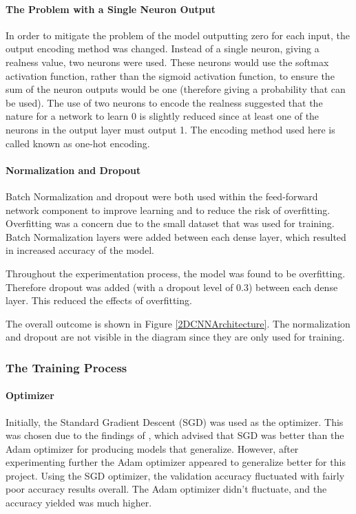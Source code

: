 \documentclass[12pt,a4paper]{article}
\begin{document}
                \paragraph{The Problem with a Single Neuron Output}
                In order to mitigate the problem of the model outputting zero for each input, the output encoding method was changed. Instead of a single neuron, giving a realness value, two neurons were used.
                These neurons would use the softmax activation function, rather than the sigmoid activation function, to ensure the sum of the neuron outputs would be one (therefore giving a probability that can be used).
                The use of two neurons to encode the realness suggested that the nature for a network to learn 0 is slightly reduced since at least one of the neurons in the output layer must output 1. The encoding method used here
                is called known as one-hot encoding.

                \paragraph{Normalization and Dropout}
                Batch Normalization and dropout were both used within the feed-forward network component to improve learning and to reduce the risk of overfitting. Overfitting was a concern due to the small dataset that was used for training.
                Batch Normalization layers were added between each dense layer, which resulted in increased accuracy of the model.

                Throughout the experimentation process, the model was found to be overfitting. Therefore dropout was added (with a dropout level of 0.3) between each dense layer. This reduced the effects of overfitting.

                The overall outcome is shown in Figure \ref{2DCNNArchitecture}. The normalization and dropout are not visible in the diagram since they are only used for training.

        
            \subsubsection{The Training Process}
                \paragraph{Optimizer}
                Initially, the Standard Gradient Descent (SGD) was used as the optimizer. This was chosen due to the findings of \cite{SGDBetterThanAdamForImageClassification},
                which advised that SGD was better than the Adam optimizer for producing models that generalize. However, after experimenting further the Adam optimizer appeared to generalize better for this project. Using the SGD optimizer, the validation accuracy fluctuated with fairly poor accuracy results overall. The Adam optimizer didn't fluctuate, and the accuracy yielded was much higher.
\end{document}

